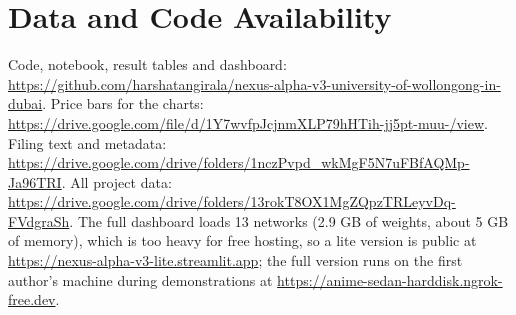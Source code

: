 \documentclass[conference]{IEEEtran}
\begin{document}
\section*{Data and Code Availability}

Code, notebook, result tables and dashboard: \url{https://github.com/harshatangirala/nexus-alpha-v3-university-of-wollongong-in-dubai}. Price bars for the charts: \url{https://drive.google.com/file/d/1Y7wvfpJcjnmXLP79hHTih-jj5pt-muu-/view}. Filing text and metadata: \url{https://drive.google.com/drive/folders/1nczPvpd_wkMgF5N7uFBfAQMp-Ja96TRI}. All project data: \url{https://drive.google.com/drive/folders/13rokT8OX1MgZQpzTRLeyvDq-FVdgraSh}. The full dashboard loads 13 networks (2.9 GB of weights, about 5 GB of memory), which is too heavy for free hosting, so a lite version is public at \url{https://nexus-alpha-v3-lite.streamlit.app}; the full version runs on the first author's machine during demonstrations at \url{https://anime-sedan-harddisk.ngrok-free.dev}.
\end{document}
